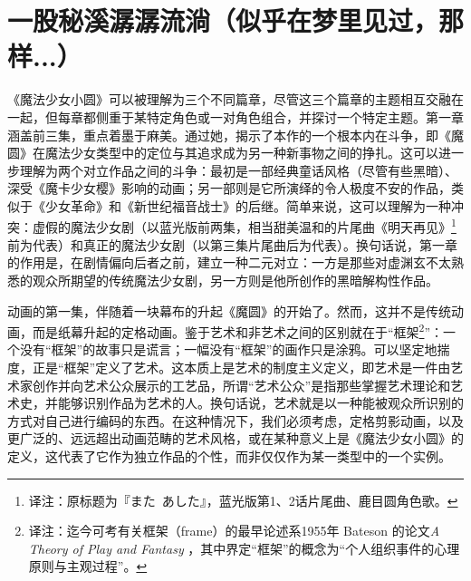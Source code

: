\chapter[一股秘溪潺潺流淌（似乎在梦里见过，那样...）]{一股秘溪潺潺流淌\protect\footnotemark（似乎在梦里见过，那样...）}


《魔法少女小圆》可以被理解为三个不同篇章，尽管这三个篇章的主题相互交融在一起，但每章都侧重于某特定角色或一对角色组合，并探讨一个特定主题。第一章涵盖前三集，重点着墨于麻美。通过她，揭示了本作的一个根本内在斗争，即《魔圆》在魔法少女类型中的定位与其追求成为另一种新事物之间的挣扎。这可以进一步理解为两个对立作品之间的斗争：最初是一部经典童话风格（尽管有些黑暗）、深受《魔卡少女樱》影响的动画；另一部则是它所演绎的令人极度不安的作品，类似于《少女革命》和《新世纪福音战士》的后继。简单来说，这可以理解为一种冲突：虚假的魔法少女剧（以蓝光版前两集，相当甜美温和的片尾曲《明天再见》\footnote{译注：原标题为『また\, あした』，蓝光版第1、2话片尾曲、鹿目圆角色歌。}前为代表）和真正的魔法少女剧（以第三集片尾曲后为代表）。换句话说，第一章的作用是，在剧情偏向后者之前，建立一种二元对立：一方是那些对虚渊玄不太熟悉的观众所期望的传统魔法少女剧，另一方则是他所创作的黑暗解构性作品。

动画的第一集，伴随着一块幕布的升起《魔圆》的开始了。然而，这并不是传统动画，而是纸幕升起的定格动画。鉴于艺术和非艺术之间的区别就在于“框架\footnote{译注：迄今可考有关框架（frame）的最早论述系1955年 Bateson 的论文\emph{A Theory of Play and Fantasy} ，其中界定“框架”的概念为“个人组织事件的心理原则与主观过程”。}”：一个没有“框架”的故事只是谎言；一幅没有“框架”的画作只是涂鸦。可以坚定地揣度，正是“框架”定义了艺术。这本质上是艺术的制度主义定义，即艺术是一件由艺术家创作并向艺术公众展示的工艺品，所谓“艺术公众”是指那些掌握艺术理论和艺术史，并能够识别作品为艺术的人\cite{ref9}。换句话说，艺术就是以一种能被观众所识别的方式对自己进行编码的东西。在这种情况下，我们必须考虑，定格剪影动画，以及更广泛的、远远超出动画范畴的艺术风格，或在某种意义上是《魔法少女小圆》的定义，这代表了它作为独立作品的个性，而非仅仅作为某一类型中的一个实例。

